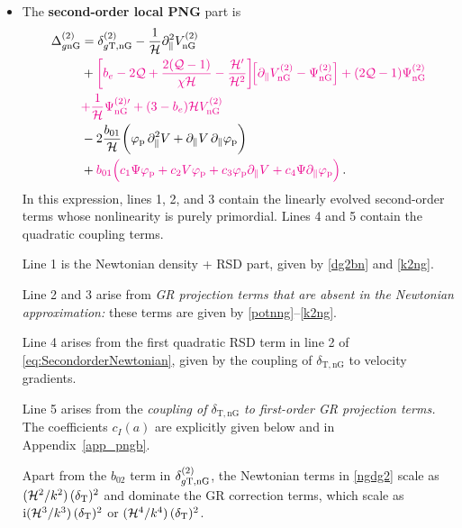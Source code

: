 {{{{\begin{itemize}
The  quadratic terms in~\eqref{odg2} are given in full by~\cite{Jolicoeur:2017nyt}. For convenience,  Appendix~\ref{app_betas} presents all of the terms in~\eqref{odg2}, correcting some errors in~\cite{Jolicoeur:2017nyt}. 

\item
 The {\bfseries second-order local PNG} part is 
 \begin{align}
\Delta_{g\mathrm{nG}}^{(2)} &= \delta^{{(2)}}_{g{\mathrm{T,nG}}} 
- \frac{1}{\mathcal{H}}\partial_{\parallel}^{2}V_{\mathrm{nG}}^{(2)}\nonumber \\
& + {\color{magenta}{\left[b_{e} - 2\mathcal{Q} +\frac{2(\mathcal{Q}-1)}{\chi\mathcal{H}}- \frac{\mathcal{H}'}{\mathcal{H}^{2}} \right]\!\!\left[\partial_{\parallel}V^{(2)}_{\mathrm{nG}} -\Psi^{(2)}_{\mathrm{nG}} \right] + (2\mathcal{Q}-1) \Psi^{(2)}_{\mathrm{nG}}}} \nonumber \\
& {\color{magenta}{+ \frac{1}{\mathcal{H}} \Psi^{(2)\prime}_{\mathrm{nG}} +(3-b_e){\cal H}V^{{(2)}}_{\mathrm{nG}}}}
 \nonumber \\
\label{ngdg2}
&- 2\frac{b_{01}}{\mathcal{H}}\bigg(\varphi_{\mathrm{p}}\,\partial_{\parallel}^{2}V + \partial_{\parallel}V\,\partial_{\parallel}\varphi_{\mathrm{p}}\bigg) \notag\\
& + {\color{magenta}{b_{01} \Big(c_1 \Psi \varphi_{\mathrm{p}} + c_2 V \varphi_{\mathrm{p}}+c_3 \varphi_{\mathrm{p}} \partial_{\parallel}V + c_4 \Psi \partial_{\parallel}\varphi_{\mathrm{p}} \Big)}}\,.
\end{align}
In this expression, lines 1, 2, and 3 contain the linearly evolved second-order terms  whose nonlinearity is purely primordial. Lines 4 and 5 contain the quadratic coupling terms. 

Line 1 is the Newtonian density + RSD  part, given by \eqref{dg2bn} and  \eqref{k2ng}. 

Line 2 and 3 arise from {\em GR projection terms that are absent in the Newtonian approximation:} these terms are given by \eqref{potnng}--\eqref{k2ng}. 

Line 4 arises from the first quadratic RSD term  in line 2 of \eqref{eq:SecondorderNewtonian}, given by the coupling of $\delta_{\mathrm{T,nG}}$ to velocity gradients.

Line 5 arises from the {\em coupling of $\delta_{\mathrm{T,nG}}$  to first-order GR projection terms.}  The  coefficients $c_I(a)$ are explicitly given below and in Appendix~\ref{app_pngb}.

{Apart from the $b_{02}$ term in $\delta^{{(2)}}_{g{\mathrm{T,nG}}}$, the Newtonian terms in \eqref{ngdg2} scale as $(\mathcal{H}^2/k^2)\,(\delta_{\mathrm{T}})^2$  and dominate the  GR correction terms, which scale as ${\mathrm{i}}(\mathcal{H}^3/k^3)\,(\delta_{\mathrm{T}})^2$ or $(\mathcal{H}^4/k^4)\,(\delta_{\mathrm{T}})^2$.}


\end{itemize}}}}}
